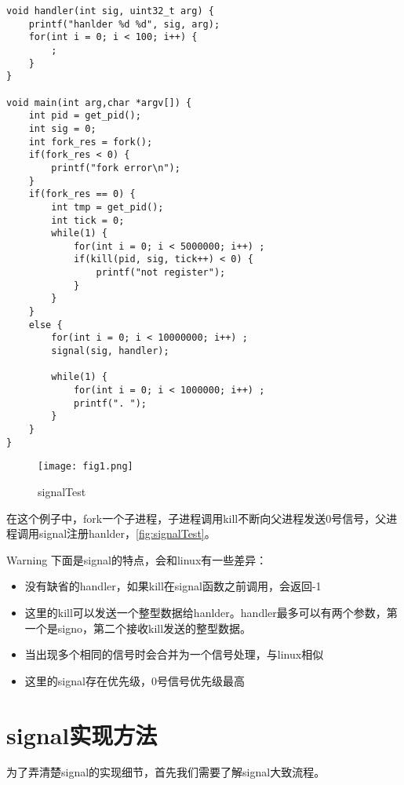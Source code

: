 \documentclass[UTF8]{ctexart}
\begin{document}
\begin{verbatim}
void handler(int sig, uint32_t arg) {
    printf("hanlder %d %d", sig, arg);
    for(int i = 0; i < 100; i++) {
        ;
    }
}

void main(int arg,char *argv[]) {
    int pid = get_pid();
    int sig = 0;
    int fork_res = fork();
    if(fork_res < 0) {
        printf("fork error\n");
    }
    if(fork_res == 0) {
        int tmp = get_pid();
        int tick = 0;
        while(1) {
            for(int i = 0; i < 5000000; i++) ;
            if(kill(pid, sig, tick++) < 0) {
                printf("not register");
            }
        }
    }
    else {
        for(int i = 0; i < 10000000; i++) ;
        signal(sig, handler);
        
        while(1) {
            for(int i = 0; i < 1000000; i++) ;
            printf(". ");
        }
    }
}
\end{verbatim}

\begin{figure}[ht]
    \centering
    \texttt{[image: fig1.png]}
    \caption{signalTest}
    \label{fig:signalTest}
\end{figure}


在这个例子中，fork一个子进程，子进程调用kill不断向父进程发送0号信号，父进程调用signal注册hanlder，\autoref{fig:signalTest}。


\begin{mybox}{Warning}
    下面是signal的特点，会和linux有一些差异：
    \begin{itemize}
        \item 没有缺省的handler，如果kill在signal函数之前调用，会返回-1
        \item 这里的kill可以发送一个整型数据给hanlder。handler最多可以有两个参数，第一个是signo，第二个接收kill发送的整型数据。
        \item 当出现多个相同的信号时会合并为一个信号处理，与linux相似
        \item 这里的signal存在优先级，0号信号优先级最高
    \end{itemize}
\end{mybox}

\section{signal实现方法}

为了弄清楚signal的实现细节，首先我们需要了解signal大致流程。
\end{document}
